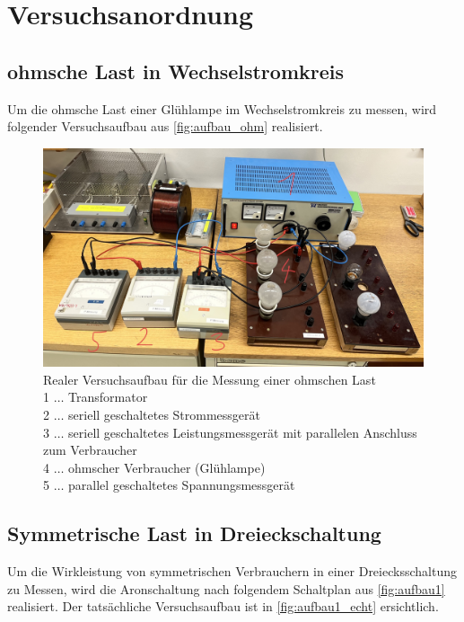 \documentclass[12pt,english,ngerman]{scrartcl}
\begin{document}

\section{Versuchsanordnung}\label{sec:versuchsanordnung}

\subsection{ohmsche Last in Wechselstromkreis}

Um die ohmsche Last einer Glühlampe im Wechselstromkreis zu messen, wird
folgender Versuchsaufbau aus \autoref{fig:aufbau_ohm} realisiert.

\begin{figure}[H]
	\centering
	\includegraphics[width = 0.5\linewidth]{./figures/aufbau_ohm.png}
	\caption[Realer Versuchsaufbau für die Messung einer ohmschen Last]{Realer
		Versuchsaufbau für die Messung einer ohmschen Last \\
		1 \(\dots\) Transformator                          \\
		2 \(\dots\) seriell geschaltetes Strommessgerät    \\
		3 \(\dots\) seriell geschaltetes Leistungsmessgerät mit parallelen Anschluss
		zum Verbraucher                                    \\
		4 \(\dots\) ohmscher Verbraucher (Glühlampe)       \\
		5 \(\dots\) parallel geschaltetes Spannungsmessgerät
	}\label{fig:aufbau_ohm}
\end{figure}

\subsection{Symmetrische Last in Dreieckschaltung}

Um die Wirkleistung von symmetrischen Verbrauchern in einer Dreiecksschaltung
zu Messen, wird die Aronschaltung nach folgendem Schaltplan aus
\autoref{fig:aufbau1} realisiert. Der tatsächliche Versuchsaufbau ist in
\autoref{fig:aufbau1_echt} ersichtlich.
\end{document}
